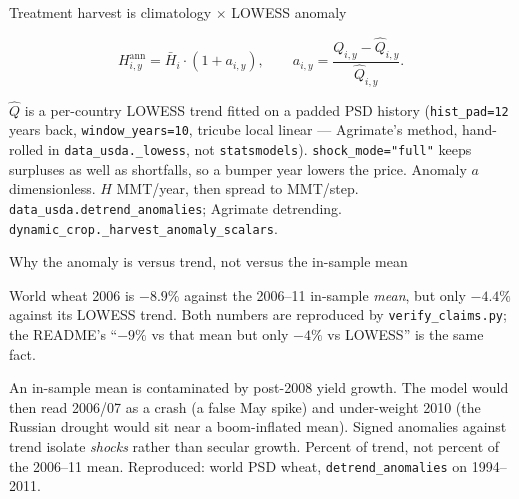 \begin{frame}{Treatment harvest is climatology $\times$ LOWESS anomaly}

\[
H_{i,y}^{\mathrm{ann}} = \bar H_i \cdot (1+a_{i,y}),
\qquad
a_{i,y} = \frac{Q_{i,y}-\hat Q_{i,y}}{\hat Q_{i,y}}.
\]

$\hat Q$ is a per-country LOWESS trend fitted on a padded PSD history
(\texttt{hist\_pad=12} years back, \texttt{window\_years=10}, tricube local
linear --- Agrimate's method, hand-rolled in \texttt{data\_usda.\_lowess},
not \texttt{statsmodels}). \texttt{shock\_mode="full"} keeps surpluses as
well as shortfalls, so a bumper year lowers the price.
{Anomaly $a$ dimensionless. $H$ MMT/year, then spread to MMT/step.}
{\texttt{data\_usda.detrend\_anomalies}; Agrimate detrending.
\texttt{dynamic\_crop.\_harvest\_anomaly\_scalars}.}
\end{frame}

\begin{frame}{Why the anomaly is versus trend, not versus the in-sample mean}

World wheat 2006 is $-8.9\%$ against the 2006--11 in-sample \emph{mean},
but only $-4.4\%$ against its LOWESS trend. Both numbers are reproduced by
\texttt{verify\_claims.py}; the README's ``$-9\%$ vs that mean but only
$-4\%$ vs LOWESS'' is the same fact.

An in-sample mean is contaminated by post-2008 yield growth. The model
would then read 2006/07 as a crash (a false May spike) and under-weight
2010 (the Russian drought would sit near a boom-inflated mean). Signed
anomalies against trend isolate \emph{shocks} rather than secular growth.
{Percent of trend, not percent of the 2006--11 mean.}
{Reproduced: world PSD wheat, \texttt{detrend\_anomalies} on 1994--2011.}
\end{frame}

